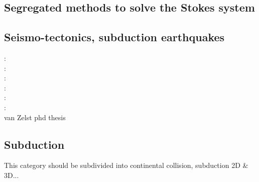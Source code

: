 \begin{scriptsize}
\cite{pefc78}
\cite{pazw07}
\cite{cohu09}
\cite{conr13}
\end{scriptsize}

\subsection{Segregated methods to solve the Stokes system}

\begin{scriptsize}
\cite{raju91}
\cite{haeh93}
\cite{leru95}
\cite{duto98}
\cite{wade03}
\cite{wade04}
\cite{utne08}
\end{scriptsize}

\subsection{Seismo-tectonics, subduction earthquakes}

\begin{scriptsize}
\twothousandthree:
\cite{bocs03}\\
\twothousandtwelve:
\cite{wahh12}\\
\twothousandthirteen:
\cite{vagd13a,vagd13b}\cite{milp13}\cite{myhi13}\\
\twothousandfourteen:
\cite{vamd14}\\
\twothousandfifteen:
\cite{hevg15}\\
\twothousandeighteen:
\cite{gofv18}\cite{hefg18}\cite{hegv18}\\
\twothousandnineteen
\cite{vawg19} van Zelst phd thesis \cite{vanzelst}
\end{scriptsize}

\subsection{Subduction} 
This category should be subdivided into continental collision, subduction 2D \& 3D...

